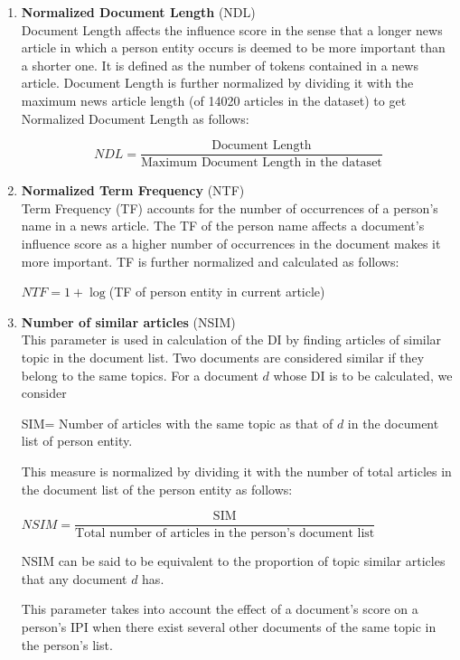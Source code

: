 \documentclass[10pt,journal,compsoc]{IEEEtran}
\begin{document}
\begin{enumerate}
\item \textbf{Normalized Document Length} (NDL)\\
Document Length affects the influence score in the sense that a longer news article in which a person entity occurs is deemed to be more important than a shorter one. It is defined as the number of tokens contained in a news article. Document Length is further normalized by dividing it with the maximum news article length (of 14020 articles in the dataset) to get Normalized Document Length as follows: 

$$NDL=\dfrac{\text{Document Length}} {\text{Maximum Document Length in the dataset}}$$



\item\textbf{ Normalized Term Frequency} (NTF)\\
Term Frequency (TF) accounts for the number of occurrences of a person's name in a news article. The TF of the person name affects a document's influence score as a higher number of occurrences in the document makes it more important. TF is further normalized and calculated as follows:

\begin{center}
$NTF=	1	+\log	$(TF of person entity in current article)
\end{center}

\item \textbf{Number of similar articles} (NSIM)\\
This parameter is used in calculation of the DI by finding articles of similar topic in the document list. 
Two documents are considered similar if they belong to the same topics. For a document $d$ whose DI is to be calculated, we consider 

SIM= Number of articles with the same topic as that of $d$ in the document list of person entity.

This measure is normalized by dividing it with the number of total articles in the document list of the person entity as follows:

\begin{center}
$NSIM= \dfrac{\text{SIM}} {\text{Total number of articles in the person's document list}}$
\end{center}
NSIM can be said to be equivalent to the proportion of topic similar articles that any document $d$ has.

This parameter takes into account the effect of a document's score on a person's IPI when there exist several other documents of the same topic in the person's list. 


\end{enumerate}
\end{document}
